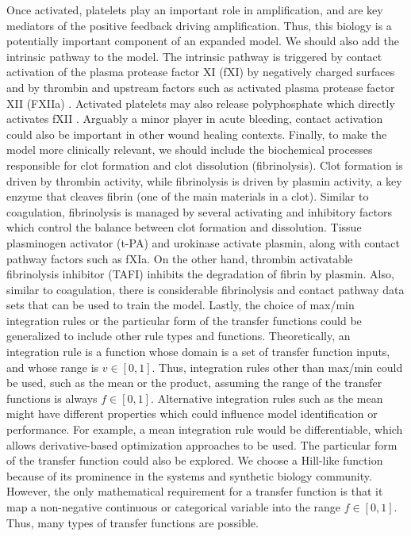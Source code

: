 \documentclass[processes,article,received,moreauthors,pdftex,12pt,a4paper]{mdpi}
\begin{document}
Once activated, platelets play an important role in amplification, and are key mediators of the positive feedback driving amplification.
Thus, this biology is a potentially important component of an expanded model.
We should also add the intrinsic pathway to the model. 
The intrinsic pathway is triggered by contact activation of the plasma protease factor XI (fXI) by negatively charged surfaces and by thrombin and upstream factors such as activated
plasma protease factor XII (FXIIa) \citep{NAITO1991,Gailani:1991aa}.
Activated platelets may also release polyphosphate which directly activates fXII \cite{Smith:2006zl}. 
Arguably a minor player in acute bleeding, contact activation could also be important in other wound healing contexts. 
Finally, to make the model more clinically relevant, we should include the biochemical processes responsible for clot formation and clot dissolution (fibrinolysis).
Clot formation is driven by thrombin activity, while fibrinolysis is driven by plasmin activity, a key enzyme that cleaves fibrin (one of the main materials in a clot).
Similar to coagulation, fibrinolysis is managed by several activating and inhibitory factors which control the balance between clot formation and dissolution.
Tissue plasminogen activator (t-PA) and urokinase activate plasmin, along with contact pathway factors such as fXIa. On the other hand, thrombin activatable fibrinolysis inhibitor (TAFI)
inhibits the degradation of fibrin by plasmin. Also, similar to coagulation, there is considerable fibrinolysis and contact pathway data sets that can be used to train the model.
Lastly, the choice of max/min integration rules or the particular form of the transfer functions could be generalized to include other rule types and functions. 
Theoretically, an integration rule is a function whose domain is a set of transfer function inputs, and whose range is $v\in[0,1]$.
Thus, integration rules other than max/min could be used, such as the mean or the product, assuming the range of the transfer functions is always $f\in[0,1]$.
Alternative integration rules such as the mean might have different properties which could influence model identification or performance. 
For example, a mean integration rule would be differentiable, which allows derivative-based optimization approaches to be used. 
The particular form of the transfer function could also be explored. We choose a Hill-like function because of its 
prominence in the systems and synthetic biology community. 
However, the only mathematical requirement for a transfer function is that it map a non-negative continuous or categorical variable into the 
range $f\in[0,1]$. Thus, many types of transfer functions are possible.
\end{document}
